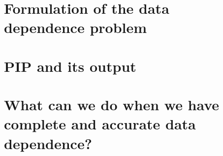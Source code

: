 \section{Formulation of the data dependence problem}

\section{PIP and its output}

\section{What can we do when we have complete and accurate data dependence?}
